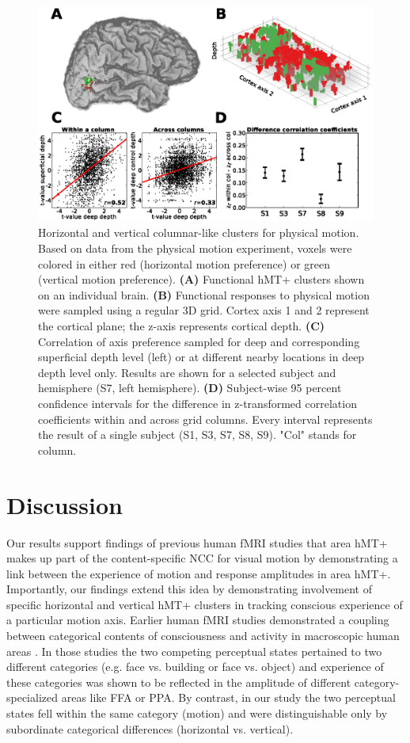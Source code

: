 \begin{figure}[htbp!]
\centering
\includegraphics[width=\textwidth]{figures/chapter_03/fig4.eps}
\caption{Horizontal and vertical columnar-like clusters for physical motion. Based on data from the physical motion experiment, voxels were colored in either red (horizontal motion preference) or green (vertical motion preference). \textbf{(A)} Functional hMT+ clusters shown on an individual brain. \textbf{(B)} Functional responses to physical motion were sampled using a regular 3D grid. Cortex axis 1 and 2 represent the cortical plane; the z-axis represents cortical depth. \textbf{(C)} Correlation of axis preference sampled for deep and corresponding superficial depth level (left) or at different nearby locations in deep depth level only. Results are shown for a selected subject and hemisphere (S7, left hemisphere). \textbf{(D)} Subject-wise 95 percent confidence intervals for the difference in z-transformed correlation coefficients within and across grid columns. Every interval represents the result of a single subject (S1, S3, S7, S8, S9). "Col" stands for column.}
\label{fig:clusters}
\end{figure}

\section{Discussion}
Our results support findings of previous human fMRI studies \parencite{Sterzer2002,Muckli2002,Castelo-Branco2002, Kamitani2006, Brouwer2007} that area hMT+ makes up part of the content-specific NCC for visual motion by demonstrating a link between the experience of motion and response amplitudes in area hMT+. Importantly, our findings extend this idea by demonstrating involvement of specific horizontal and vertical hMT+ clusters in tracking conscious experience of a particular motion axis. Earlier human fMRI studies demonstrated a coupling between categorical contents of consciousness and activity in macroscopic human areas \parencite{Tong1998,Hasson2001,Andrews2002}. In those studies the two competing perceptual states pertained to two different categories (e.g. face vs. building or face vs. object) and experience of these categories was shown to be reflected in the amplitude of different category-specialized areas like FFA or PPA. By contrast, in our study the two perceptual states fell within the same category (motion) and were distinguishable only by subordinate categorical differences (horizontal vs. vertical).

